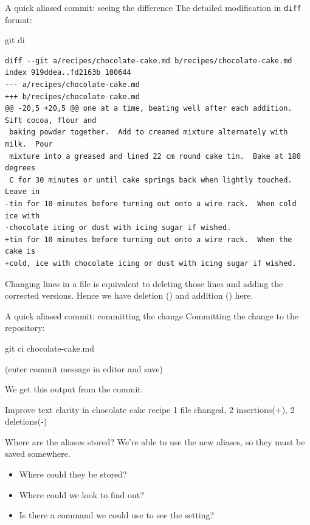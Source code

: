 \begin{frame}[fragile]{A quick aliased commit: seeing the difference}
    The detailed modification in \texttt{diff} format:
    \begin{shellcode}
        git di
    \end{shellcode}
    \begin{verbatim}
diff --git a/recipes/chocolate-cake.md b/recipes/chocolate-cake.md
index 919ddea..fd2163b 100644
--- a/recipes/chocolate-cake.md
+++ b/recipes/chocolate-cake.md
@@ -20,5 +20,5 @@ one at a time, beating well after each addition.  Sift cocoa, flour and
 baking powder together.  Add to creamed mixture alternately with milk.  Pour
 mixture into a greased and lined 22 cm round cake tin.  Bake at 180 degrees
 C for 30 minutes or until cake springs back when lightly touched.  Leave in
-tin for 10 minutes before turning out onto a wire rack.  When cold ice with
-chocolate icing or dust with icing sugar if wished.
+tin for 10 minutes before turning out onto a wire rack.  When the cake is
+cold, ice with chocolate icing or dust with icing sugar if wished.
    \end{verbatim}
    Changing lines in a file is equivalent to deleting those lines and
    adding the corrected versions.  Hence we have deletion (\code{-}) and
    addition (\code{+}) here.
\end{frame}

\begin{frame}[fragile]{A quick aliased commit: committing the change}
    Committing the change to the repository:
    \begin{shellcode}
        git ci chocolate-cake.md
    \end{shellcode}
    (enter commit message in editor and save)

    We get this output from the commit:
    \begin{outputcode}[autogobble=false]
[main c0aa49a] Improve text clarity in chocolate cake recipe
 1 file changed, 2 insertions(+), 2 deletions(-)
    \end{outputcode}
\end{frame}

\begin{frame}[fragile]{Where are the aliases stored?}
    We're able to use the new aliases, so they must be saved somewhere.
    \begin{itemize}
        \item Where could they be stored?
        \item Where could we look to find out?
        \item Is there a command we could use to see the setting?
    \end{itemize}
\end{frame}

